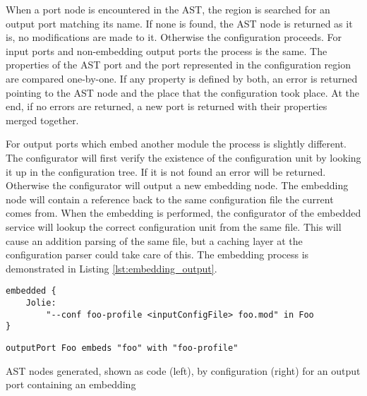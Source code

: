 When a port node is encountered in the AST, the  region is
searched for an output port matching its name. If none is found, the AST node
is returned as it is, no modifications are made to it. Otherwise the
configuration proceeds. For input ports and non-embedding output ports the
process is the same. The properties of the AST port and the port represented in
the configuration region are compared one-by-one. If any property is defined by
both, an error is returned pointing to the AST node and the place that the
configuration took place. At the end, if no errors are returned, a new port is
returned with their properties merged together.

For output ports which embed another module the process is slightly different.
The configurator will first verify the existence of the configuration unit by
looking it up in the configuration tree. If it is not found an error will be
returned. Otherwise the configurator will output a new embedding node. The
embedding node will contain a reference back to the same configuration file the
current  comes from. When the embedding is performed, the
configurator of the embedded service will lookup the correct configuration unit
from the same file. This will cause an addition parsing of the same
file, but a caching layer at the configuration parser could take care of this.
The embedding process is demonstrated in Listing \ref{lst:embedding_output}.

\begin{listing}[H]
\begin{multicols}{2}

\begin{verbatim}
embedded {
    Jolie:
        "--conf foo-profile <inputConfigFile> foo.mod" in Foo
}
\end{verbatim}

\columnbreak

\begin{verbatim}
outputPort Foo embeds "foo" with "foo-profile"
\end{verbatim}

\end{multicols}

\caption{AST nodes generated, shown as code (left), by configuration (right)
    for an output port containing an embedding}

\label{lst:embedding_output}

\end{listing}

